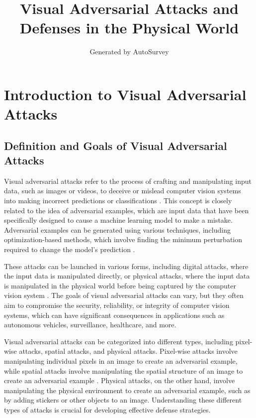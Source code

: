 \documentclass[11pt]{article}
\title{Visual Adversarial Attacks and Defenses in the Physical World}
\author{Generated by AutoSurvey}
\date{}
\begin{document}
\maketitle
\tableofcontents
\newpage

\section{Introduction to Visual Adversarial Attacks}

\subsection{Definition and Goals of Visual Adversarial Attacks}

Visual adversarial attacks refer to the process of crafting and manipulating input data, such as images or videos, to deceive or mislead computer vision systems into making incorrect predictions or classifications \cite{ref1}. This concept is closely related to the idea of adversarial examples, which are input data that have been specifically designed to cause a machine learning model to make a mistake. Adversarial examples can be generated using various techniques, including optimization-based methods, which involve finding the minimum perturbation required to change the model's prediction \cite{ref2}.

These attacks can be launched in various forms, including digital attacks, where the input data is manipulated directly, or physical attacks, where the input data is manipulated in the physical world before being captured by the computer vision system \cite{ref3}. The goals of visual adversarial attacks can vary, but they often aim to compromise the security, reliability, or integrity of computer vision systems, which can have significant consequences in applications such as autonomous vehicles, surveillance, healthcare, and more.

Visual adversarial attacks can be categorized into different types, including pixel-wise attacks, spatial attacks, and physical attacks. Pixel-wise attacks involve manipulating individual pixels in an image to create an adversarial example, while spatial attacks involve manipulating the spatial structure of an image to create an adversarial example \cite{ref4}. Physical attacks, on the other hand, involve manipulating the physical environment to create an adversarial example, such as by adding stickers or other objects to an image. Understanding these different types of attacks is crucial for developing effective defense strategies.
\end{document}
